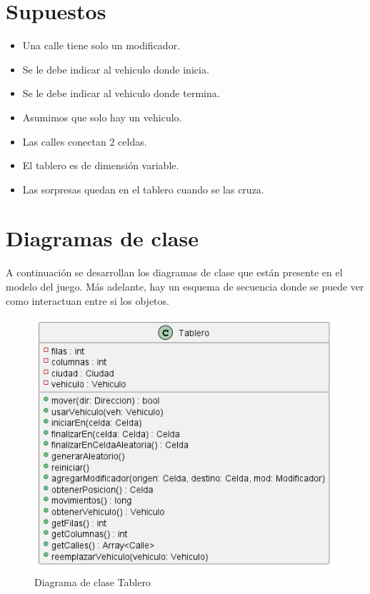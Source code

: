 \documentclass[titlepage,a4paper]{article}
\begin{document}
\section{Supuestos}\label{sec:supuestos}
  \begin{itemize}
    \item Una calle tiene solo un modificador.
    \item Se le debe indicar al vehiculo donde inicia.
    \item Se le debe indicar al vehiculo donde termina.
    \item Asumimos que solo hay un vehiculo.
    \item Las calles conectan 2 celdas.
    \item El tablero es de dimensión variable.
    \item Las sorpresas quedan en el tablero cuando se las cruza.
  \end{itemize}
\section{Diagramas de clase}\label{sec:diagramasdeclase}

A continuación se desarrollan los diagramas de clase que están presente en el modelo del juego. Más adelante, hay un esquema de secuencia donde se puede ver como interactuan entre si los objetos.

\begin{figure}[H]
  \centering
  \includegraphics[width=1\textwidth]{diagramas/modelo-actual.png}
  \caption{\label{fig:seq01} Diagrama de clase Tablero}
\end{figure}
\end{document}

